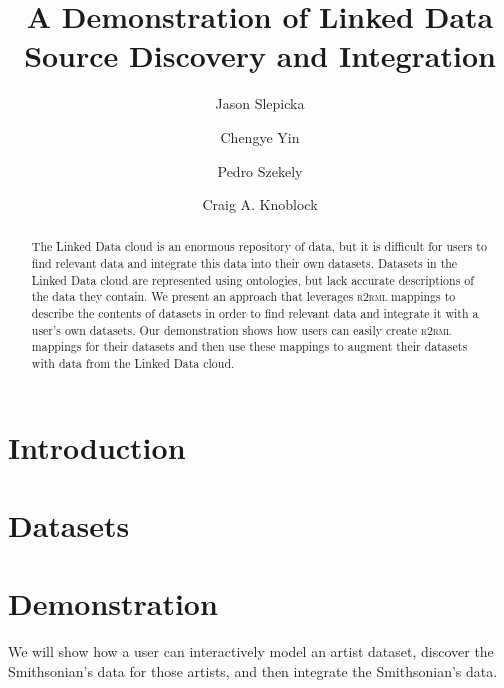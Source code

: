 \documentclass[runningheads,a4paper]{llncs}
\newcommand{\rtworml}{\textsc{r2rml}\xspace}
\begin{document}
\mainmatter  %
\title{A Demonstration of Linked Data Source Discovery and Integration}
%
\author{Jason Slepicka%
\and Chengye Yin\and Pedro Szekely\and Craig A. Knoblock}
%
\maketitle
\begin{abstract}
The Linked Data cloud is an enormous repository of data, but it is difficult for users to find relevant data and integrate this data into their own datasets. 
Datasets in the Linked Data cloud are represented using ontologies, but lack accurate descriptions of the data they contain.
We present an approach that leverages \rtworml mappings to describe the contents of datasets in order to find relevant data and integrate it with a user's own datasets.
Our demonstration shows how users can easily create \rtworml mappings for their datasets and then use these mappings to augment their datasets with data from the Linked Data cloud.
\end{abstract}

\section{Introduction} 

\section{Datasets}

\section{Demonstration}
We will show how a user can interactively model an artist dataset, discover the Smithsonian's data for those artists, and then integrate the Smithsonian's data.  
\end{document}

